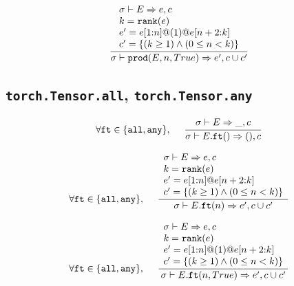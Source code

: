 \documentclass{article}
\begin{document}
\begin{align*}
  \frac
  {
    \begin{array}{l}
      \sigma \vdash E \Rightarrow e, c \\
      k = \mathtt{rank(}e\mathtt{)} \\
      e' = e \mathtt{[}1\mathtt{:}n\mathtt{]} \mathtt{@} (1) \mathtt{@} e \mathtt{[}n+2\mathtt{:}k\mathtt{]} \\
      c' = \{ (k \geq 1) \land (0 \leq n < k) \}
    \end{array}
  }
  {
    \sigma \vdash \mathtt{prod(}E, n, True\mathtt{)} \Rightarrow e', c \cup c'
  }
\end{align*}

\subsection*{\texttt{torch.Tensor.all}, \texttt{torch.Tensor.any}}
\begin{align*}
  \forall \mathtt{ft} \in \{ \mathtt{all}, \mathtt{any} \},\,\,\,\,\,\,\,\,
  \frac
  {
    \begin{array}{l}
      \sigma \vdash E \Rightarrow \_, c
    \end{array}
  }
  {
    \sigma \vdash E.\mathtt{ft(}\mathtt{)} \Rightarrow (), c
  }
\end{align*}

\begin{align*}
  \forall \mathtt{ft} \in \{ \mathtt{all}, \mathtt{any} \},\,\,\,\,\,\,\,\,
  \frac
  {
    \begin{array}{l}
      \sigma \vdash E \Rightarrow e, c \\
      k = \mathtt{rank(}e\mathtt{)} \\
      e' = e \mathtt{[}1\mathtt{:}n\mathtt{]} \mathtt{@} e \mathtt{[}n+2\mathtt{:}k\mathtt{]} \\
      c' = \{ (k \geq 1) \land (0 \leq n < k) \}
    \end{array}
  }
  {
    \sigma \vdash E.\mathtt{ft(}n\mathtt{)} \Rightarrow e', c \cup c'
  }
\end{align*}

\begin{align*}
  \forall \mathtt{ft} \in \{ \mathtt{all}, \mathtt{any} \},\,\,\,\,\,\,\,\,
  \frac
  {
    \begin{array}{l}
      \sigma \vdash E \Rightarrow e, c \\
      k = \mathtt{rank(}e\mathtt{)} \\
      e' = e \mathtt{[}1\mathtt{:}n\mathtt{]} \mathtt{@} (1) \mathtt{@} e \mathtt{[}n+2\mathtt{:}k\mathtt{]} \\
      c' = \{ (k \geq 1) \land (0 \leq n < k) \}
    \end{array}
  }
  {
    \sigma \vdash E.\mathtt{ft(}n, True\mathtt{)} \Rightarrow e', c \cup c'
  }
\end{align*}
\end{document}

